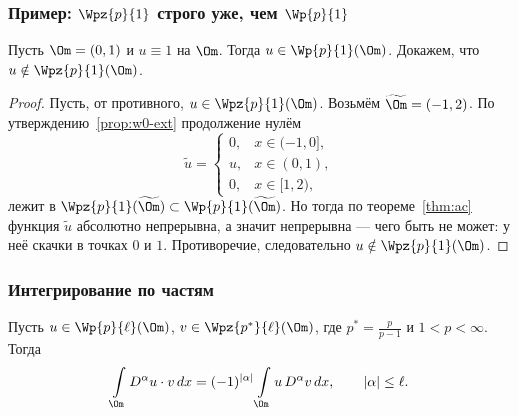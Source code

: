 \subsubsection*{Пример: $\Wpz{p}{1}$ строго уже, чем $\Wp{p}{1}$}

\begin{example}
Пусть $\Om = (0,1)$ и $u \equiv 1$ на $\Om$. Тогда $u \in \Wp{p}{1}(\Om)$. Докажем,
что $u \notin \Wpz{p}{1}(\Om)$.
\end{example}


\begin{proof}
Пусть, от противного, $u \in \Wpz{p}{1}(\Om)$. Возьмём $\widetilde\Om = (-1,2)$. По
утверждению~\ref{prop:w0-ext} продолжение нулём
\[
  \widetilde u = \begin{cases}
    0, & x \in (-1, 0], \\
    u, & x \in (0, 1), \\
    0, & x \in [1, 2),
  \end{cases}
\]
лежит в $\Wpz{p}{1}(\widetilde\Om) \subset \Wp{p}{1}(\widetilde\Om)$. Но тогда по
теореме~\ref{thm:ac} функция $\widetilde u$ абсолютно непрерывна, а значит непрерывна —
чего быть не может: у неё скачки в точках $0$ и $1$. Противоречие, следовательно
$u \notin \Wpz{p}{1}(\Om)$.
\end{proof}

\subsubsection*{Интегрирование по частям}

\begin{theorem}\label{thm:parts}
Пусть $u \in \Wp{p}{\ell}(\Om)$, $v \in \Wpz{p^*}{\ell}(\Om)$, где
$p^* = \frac{p}{p-1}$ и $1 < p < \infty$. Тогда
\[
  \int\limits_\Om D^\alpha u \cdot v\, dx
  = (-1)^{|\alpha|} \int\limits_\Om u\, D^\alpha v\, dx ,
  \qquad |\alpha| \le \ell .
\]
\end{theorem}

